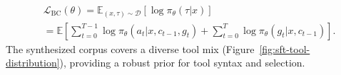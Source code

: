 \begin{equation*}
    \begin{aligned}
        &\mathcal{L}_{\text{BC}}(\theta)=\mathbb{E}_{(x,\tau)\sim\mathcal{D}}[\log\pi_\theta(\tau|x)]\\
        &=\mathbb{E}\left[\sum_{t=0}^{T-1}\log\pi_\theta(a_t|x,c_{t-1},g_t)+\sum_{t=0}^{T}\log\pi_\theta(g_t|x,c_{t-1})\right].
    \end{aligned}
\end{equation*}
The synthesized corpus covers a diverse tool mix (Figure~\ref{fig:sft-tool-distribution}), providing a robust prior for tool syntax and selection. 


